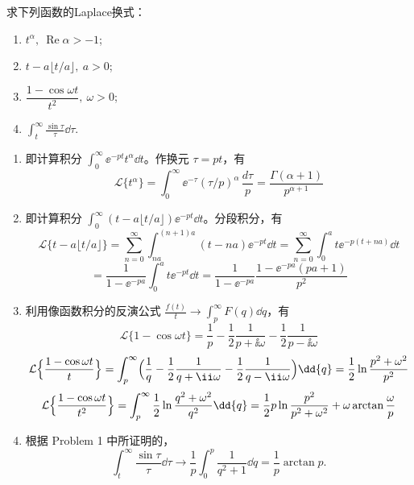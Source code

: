 \begin{question}
\begin{solution}
\begin{center}
\end{center}
\end{solution}
\end{question}

\begin{question}
求下列函数的Laplace换式：
\begin{enumerate}
  \item \(t^\alpha,\ \operatorname{Re}\alpha >-1\);
  \item \(t-a\lfloor t/a\rfloor,\ a>0\);
  \item \(\dfrac{1-\cos\omega t}{t^2},\ \omega>0\);
  \item \(\displaystyle\int_t^\infty \frac{\sin\tau}{\tau}\dd{}\tau\).
\end{enumerate}
\begin{solution}

\begin{enumerate}
  \item 即计算积分 \(\displaystyle\int_0^\infty \ee^{-p t} t^{\alpha}\dd{t}\)。作换元 \(\tau = p t\)，有 \[ \mathcal{L}\{t^\alpha\}=\int_0^\infty \ee^{-\tau} (\tau/p)^{\alpha}\,\frac{d\tau}{p} = \frac{\Gamma(\alpha+1)}{p^{\alpha+1}} \]

  \item 即计算积分 \(\displaystyle\int_0^\infty (t-a\lfloor t/a\rfloor) \ee^{-p t}\dd{t}\)。分段积分，有 \[ \mathcal{L}\{t-a\lfloor t/a\rfloor\} = \sum_{n=0}^\infty \int_{n a}^{(n+1) a} (t-n a) \ee^{-p t}\dd{t} = \sum_{n=0}^\infty \int_0^a t \ee^{-p (t+n a)}\dd{t} \] \[ = \frac{1}{1-\ee^{-p a}} \int_0^a t \ee^{-p t}\dd{t} = \frac{1}{1-\ee^{-p a}}\frac{1-\ee^{-p a}(p a+1)}{p^2} \]

  \item 利用像函数积分的反演公式 \(\displaystyle\frac{f(t)}{t} \to \int_p^\infty F(q)\dd{q}\)，有 \[ \mathcal{L}\{1-\cos\omega t\}=\frac1p-\frac12\frac1{p+\ii\omega}-\frac12\frac1{p-\ii\omega} \] \[ \mathcal{L}\Bigl\{\frac{1-\cos\omega t}{t}\Bigr\} = \int_p^\infty \Bigl(\frac1q-\frac12\frac1{q+\ii\omega}-\frac12\frac1{q-\ii\omega}\Bigr)\dd{q} = \frac12\ln\frac{p^2+\omega^2}{p^2} \] \[ \mathcal{L}\Bigl\{\frac{1-\cos\omega t}{t^2}\Bigr\} = \int_p^\infty \frac12\ln\frac{q^2+\omega^2}{q^2}\dd{q} = \frac12 p\ln\frac{p^2}{p^2+\omega^2}+\omega\arctan\frac{\omega}{p} \]

  \item 根据 Problem 1 中所证明的，
  \[
  \int_t^\infty \frac{\sin\tau}{\tau}\dd{\tau}
  \longrightarrow
  \frac1p\int_0^p\frac{1}{q^2+1}\dd{q}
  =\frac1p\arctan p.
  \]
\end{enumerate}
\end{solution}
\end{question}


